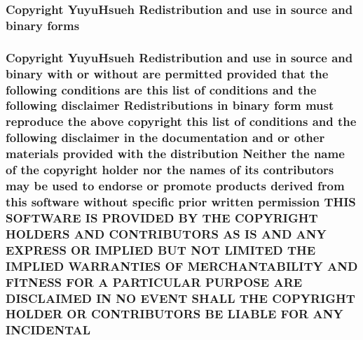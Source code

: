 \subsubsection[{\texorpdfstring{forms}{forms}}]{\setlength{\rightskip}{0pt plus 5cm}Copyright Yuyu\+Hsueh Redistribution and use in source and binary forms}\hypertarget{license_8txt_a907462b7b3ae0a9072f23e05f66fb7f1}{}\label{license_8txt_a907462b7b3ae0a9072f23e05f66fb7f1}
\subsubsection[{\texorpdfstring{I\+N\+C\+I\+D\+E\+N\+T\+AL}{INCIDENTAL}}]{\setlength{\rightskip}{0pt plus 5cm}Copyright Yuyu\+Hsueh Redistribution and use in source and binary with or without are permitted provided that the following conditions are this list of conditions and the following disclaimer Redistributions in binary form must reproduce the above copyright this list of conditions and the following disclaimer in the documentation and or other materials provided with the distribution Neither the name of the copyright holder nor the names of its contributors may be used to endorse or promote products derived from this software without specific prior written permission T\+H\+IS S\+O\+F\+T\+W\+A\+RE IS P\+R\+O\+V\+I\+D\+ED BY T\+HE C\+O\+P\+Y\+R\+I\+G\+HT H\+O\+L\+D\+E\+RS A\+ND C\+O\+N\+T\+R\+I\+B\+U\+T\+O\+RS AS IS A\+ND A\+NY E\+X\+P\+R\+E\+SS OR I\+M\+P\+L\+I\+ED B\+UT N\+OT L\+I\+M\+I\+T\+ED T\+HE I\+M\+P\+L\+I\+ED {\bf W\+A\+R\+R\+A\+N\+T\+I\+ES} OF M\+E\+R\+C\+H\+A\+N\+T\+A\+B\+I\+L\+I\+TY A\+ND F\+I\+T\+N\+E\+SS F\+OR A P\+A\+R\+T\+I\+C\+U\+L\+AR P\+U\+R\+P\+O\+SE A\+RE D\+I\+S\+C\+L\+A\+I\+M\+ED IN NO E\+V\+E\+NT S\+H\+A\+LL T\+HE C\+O\+P\+Y\+R\+I\+G\+HT H\+O\+L\+D\+ER OR C\+O\+N\+T\+R\+I\+B\+U\+T\+O\+RS BE L\+I\+A\+B\+LE F\+OR A\+NY I\+N\+C\+I\+D\+E\+N\+T\+AL}\hypertarget{license_8txt_a6fe13299500a9a6c4af4434723e6afae}{}\label{license_8txt_a6fe13299500a9a6c4af4434723e6afae}
